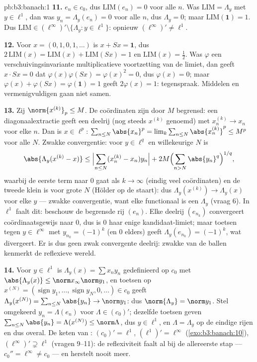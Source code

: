 \begin{solution}{pb:b3:banach:1}
\textbf{11.} $e_n \in c_0$, dus $\mathrm{LIM}(e_n) = 0$ voor alle
$n$. Was $\mathrm{LIM} = \Lambda_y$ met $y \in \ell^1$, dan was
$y_n = \Lambda_y(e_n) = 0$ voor alle $n$, dus $\Lambda_y = 0$;
maar $\mathrm{LIM}(\mathbf 1) = 1$. Dus $\mathrm{LIM} \in
(\ell^\infty)' \setminus \{\Lambda_y : y \in \ell^1\}$: opnieuw
$(\ell^\infty)' \neq \ell^1$.

\textbf{12.} Voor $x = (0,1,0,1,\dots)$ is $x + Sx = \mathbf 1$,
dus $2\,\mathrm{LIM}(x) = \mathrm{LIM}(x) + \mathrm{LIM}(Sx) = 1$
en $\mathrm{LIM}(x) = \frac12$. Was $\varphi$ een
verschuivingsinvariante multiplicatieve voortzetting van de
limiet, dan geeft $x\cdot Sx = 0$ dat $\varphi(x)\varphi(Sx) =
\varphi(x)^2 = 0$, dus $\varphi(x) = 0$; maar $\varphi(x) +
\varphi(Sx) = \varphi(\mathbf 1) = 1$ geeft $2\varphi(x) = 1$:
tegenspraak. Middelen en vermenigvuldigen gaan niet samen.

\textbf{13.} Zij $\norm{x^{(k)}}_p \leq M$. De coördinaten zijn
door $M$ begrensd: een diagonaalextractie geeft een deelrij (nog
steeds $x^{(k)}$ genoemd) met $x^{(k)}_n \to x_n$ voor elke $n$.
Dan is $x \in \ell^p$: $\sum_{n\leq N}\abs{x_n}^p =
\lim_k\sum_{n\leq N}\abs{x^{(k)}_n}^p \leq M^p$ voor alle $N$.
Zwakke convergentie: voor $y \in \ell^q$ en willekeurige $N$ is
\[
\abs{\Lambda_y(x^{(k)} - x)} \leq
\Bigl|\sum_{n \leq N}(x^{(k)}_n - x_n)y_n\Bigr|
+ 2M\Bigl(\sum_{n>N}\abs{y_n}^q\Bigr)^{1/q},
\]
waarbij de eerste term naar $0$ gaat als $k \to \infty$ (eindig
veel coördinaten) en de tweede klein is voor grote $N$ (Hölder op
de staart): dus $\Lambda_y(x^{(k)}) \to \Lambda_y(x)$ voor elke
$y$ --- zwakke convergentie, want elke functionaal is een
$\Lambda_y$ (vraag 6). In $\ell^1$ faalt dit: beschouw de
begrensde rij $(e_n)$. Elke deelrij $(e_{n_k})$ convergeert
coördinaatsgewijs naar $0$, dus is $0$ haar enige
kandidaat-limiet; maar toetsen tegen $y \in \ell^\infty$ met
$y_{n_k} = (-1)^k$ (en $0$ elders) geeft $\Lambda_y(e_{n_k}) =
(-1)^k$, wat divergeert. Er is dus geen zwak convergente deelrij:
zwakke  van de ballen kenmerkt de reflexieve
wereld.

\textbf{14.} Voor $y \in \ell^1$ is $\Lambda_y(x) = \sum x_ny_n$
gedefinieerd op $c_0$ met $\abs{\Lambda_y(x)} \leq \norm
x_\infty\norm y_1$, en toetsen op $x^{(N)} =
(\operatorname{sign}y_1, \dots, \operatorname{sign}y_N, 0, \dots)
\in c_0$ geeft $\Lambda_y(x^{(N)}) = \sum_{n\leq N}\abs{y_n} \to
\norm y_1$: dus $\norm{\Lambda_y} = \norm y_1$. Stel omgekeerd
$y_n = \Lambda(e_n)$ voor $\Lambda \in (c_0)'$; dezelfde toetsen
geven $\sum_{n \leq N}\abs{y_n} = \Lambda(x^{(N)}) \leq
\norm\Lambda$, dus $y \in \ell^1$, en $\Lambda = \Lambda_y$ op de
 eindige rijen en dus overal. De keten van :
$(c_0)' = \ell^1$, $(\ell^1)' = \ell^\infty$
(\cref{exo:b3:banach:10}), $(\ell^\infty)' \supsetneq \ell^1$
(vragen 9--11): de reflexiviteit faalt al bij de allereerste stap
--- $c_0'' = \ell^\infty \neq c_0$ --- en herstelt nooit meer.


\end{solution}
